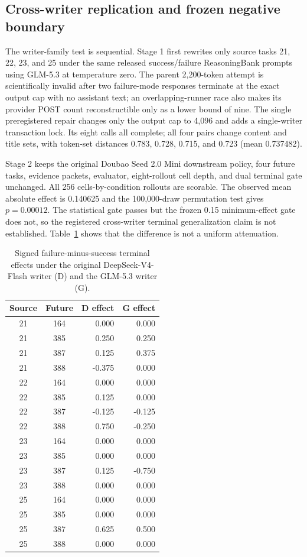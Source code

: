 \subsection{Cross-writer replication and frozen negative boundary}
The writer-family test is sequential. Stage 1 first rewrites only source tasks 21, 22, 23, and 25 under the same released success/failure ReasoningBank prompts using GLM-5.3 at temperature zero. The parent 2,200-token attempt is scientifically invalid after two failure-mode responses terminate at the exact output cap with no assistant text; an overlapping-runner race also makes its provider POST count reconstructible only as a lower bound of nine. The single preregistered repair changes only the output cap to 4,096 and adds a single-writer transaction lock. Its eight calls all complete; all four pairs change content and title sets, with token-set distances 0.783, 0.728, 0.715, and 0.723 (mean 0.737482).

Stage 2 keeps the original Doubao Seed 2.0 Mini downstream policy, four future tasks, evidence packets, evaluator, eight-rollout cell depth, and dual terminal gate unchanged. All 256 cells-by-condition rollouts are scorable. The observed mean absolute effect is 0.140625 and the 100,000-draw permutation test gives $p=0.00012$. The statistical gate passes but the frozen 0.15 minimum-effect gate does not, so the registered cross-writer terminal generalization claim is not established. Table~\ref{tab:o6-writer-compare} shows that the difference is not a uniform attenuation.

\begin{table}[h]
\centering
\scriptsize
\caption{Signed failure-minus-success terminal effects under the original DeepSeek-V4-Flash writer (D) and the GLM-5.3 writer (G).}
\label{tab:o6-writer-compare}
\begin{tabular}{ccrr}
\toprule
Source & Future & D effect & G effect \\
\midrule
21 & 164 & 0.000 & 0.000 \\
21 & 385 & 0.250 & 0.250 \\
21 & 387 & 0.125 & 0.375 \\
21 & 388 & -0.375 & 0.000 \\
22 & 164 & 0.000 & 0.000 \\
22 & 385 & 0.125 & 0.000 \\
22 & 387 & -0.125 & -0.125 \\
22 & 388 & 0.750 & -0.250 \\
23 & 164 & 0.000 & 0.000 \\
23 & 385 & 0.000 & 0.000 \\
23 & 387 & 0.125 & -0.750 \\
23 & 388 & 0.000 & 0.000 \\
25 & 164 & 0.000 & 0.000 \\
25 & 385 & 0.000 & 0.000 \\
25 & 387 & 0.625 & 0.500 \\
25 & 388 & 0.000 & 0.000 \\
\bottomrule
\end{tabular}
\end{table}

